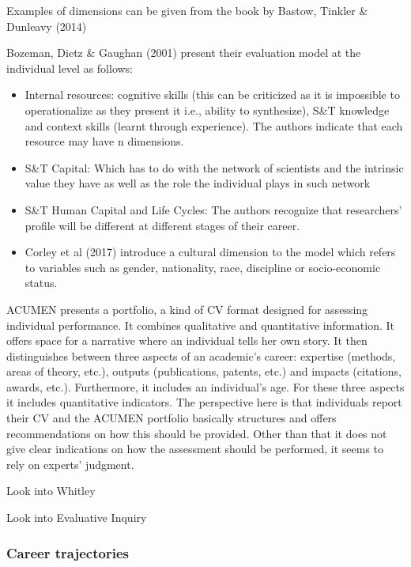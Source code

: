 \documentclass[]{elsarticle} %
\providecommand{\tightlist}{%
  \setlength{\itemsep}{0pt}\setlength{\parskip}{0pt}}
\begin{document}
Examples of dimensions can be given from the book by Bastow, Tinkler \&
Dunleavy (2014)

Bozeman, Dietz \& Gaughan (2001) present their evaluation model at the
individual level as follows:

\begin{itemize}
\tightlist
\item
  Internal resources: cognitive skills (this can be criticized as it is
  impossible to operationalize as they present it i.e., ability to
  synthesize), S\&T knowledge and context skills (learnt through
  experience). The authors indicate that each resource may have n
  dimensions.
\item
  S\&T Capital: Which has to do with the network of scientists and the
  intrinsic value they have as well as the role the individual plays in
  such network
\item
  S\&T Human Capital and Life Cycles: The authors recognize that
  researchers' profile will be different at different stages of their
  career.
\item
  Corley et al (2017) introduce a cultural dimension to the model which
  refers to variables such as gender, nationality, race, discipline or
  socio-economic status.
\end{itemize}

ACUMEN presents a portfolio, a kind of CV format designed for assessing
individual performance. It combines qualitative and quantitative
information. It offers space for a narrative where an individual tells
her own story. It then distinguishes between three aspects of an
academic's career: expertise (methods, areas of theory, etc.), outputs
(publications, patents, etc.) and impacts (citations, awards, etc.).
Furthermore, it includes an individual's age. For these three aspects it
includes quantitative indicators. The perspective here is that
individuals report their CV and the ACUMEN portfolio basically
structures and offers recommendations on how this should be provided.
Other than that it does not give clear indications on how the assessment
should be performed, it seems to rely on experts' judgment.

Look into Whitley

Look into Evaluative Inquiry

\hypertarget{career-trajectories}{%
\subsubsection{Career trajectories}\label{career-trajectories}}
\end{document}
